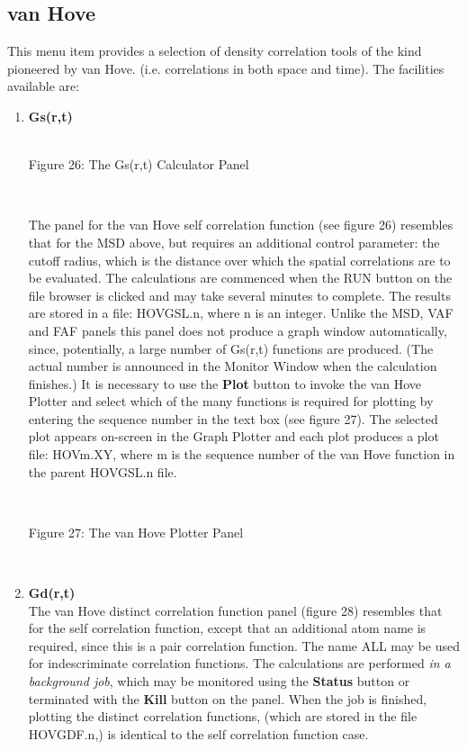 \subsection{van Hove}
This menu item provides a selection of density correlation tools of the
kind pioneered by van Hove. (i.e. correlations in both space and
time). The facilities available are:
\begin{enumerate}
\item {\bf Gs(r,t)} \\

~

\begin{center}
\centerline{}
\centerline{Figure 26: The Gs(r,t) Calculator Panel}
\end{center}

~

The panel for the van Hove self correlation function (see figure
26) resembles that for the MSD above, but requires an
additional control parameter: the cutoff radius, which is the distance
over which the spatial correlations are to be evaluated. The
calculations are commenced when the RUN button on the file browser is
clicked and may take several minutes to complete. The results are
stored in a file: HOVGSL.n, where n is an integer.  Unlike the MSD,
VAF and FAF panels this panel does not produce a graph window
automatically, since, potentially, a large number of Gs(r,t) functions
are produced. (The actual number is announced in the Monitor Window
when the calculation finishes.)  It is necessary to use the {\bf Plot}
button to invoke the van Hove Plotter and select which of the many
functions is required for plotting by entering the sequence number in
the text box (see figure 27). The selected plot appears
on-screen in the Graph Plotter and each plot produces a plot file:
HOVm.XY, where m is the sequence number of the van Hove function in
the parent HOVGSL.n file.

~

\begin{center}
\centerline{}
\centerline{Figure 27: The van Hove Plotter Panel}
\end{center}

~

\item {\bf Gd(r,t)} \\
The van Hove distinct correlation function panel (figure 28)
resembles that for the self correlation function, except that an
additional atom name is required, since this is a pair correlation
function. The name ALL may be used for indescriminate correlation
functions.  The calculations are performed {\em in a background job},
which may be monitored using the {\bf Status} button or terminated
with the {\bf Kill} button on the panel. When the job is finished,
plotting the distinct correlation functions, (which are stored in the
file HOVGDF.n,) is identical to the self correlation function case.


\end{enumerate}

